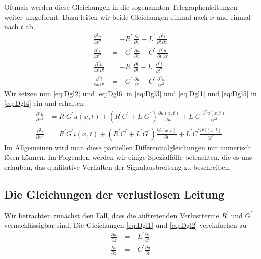 \documentclass[paper=a4, parskip=half-, ngerman, fontsize=11pt]{scrreprt}
\begin{document}
Oftmals werden diese Gleichungen in die sogenannten Telegraphenleitungen weiter umgeformt. Dazu leiten wir beide
Gleichungen einmal nach $x$ und einmal nach $t$ ab,
\begin{align}
    \frac{\partial^{2} u}{\partial x^2} &= -R^{\prime} \, \frac{\partial i}{\partial x} - L^{\prime} \,
    \frac{\partial^2 i}{\partial t \,
    \partial x} \label{eq:Dgl3} \\[1.5ex]
    \frac{\partial^{2} i}{\partial x^2} &= -G^{\prime} \, \frac{\partial u}{\partial x} - C^{\prime} \,
    \frac{\partial^2 u}{\partial t \,
    \partial x} \label{eq:Dgl4} \\[1.5ex]
    \frac{\partial^{2} u}{\partial x \, \partial t} &= -R^{\prime} \, \frac{\partial i}{\partial t} - L^{\prime} \,
    \frac{\partial^2
    i}{\partial t^{2}} \label{eq:Dgl5} \\[1.5ex]
    \frac{\partial^{2} i}{\partial x \, \partial t} &= -G^{\prime} \, \frac{\partial u}{\partial t} - C^{\prime} \,
    \frac{\partial^2
    u}{\partial t^{2}} \label{eq:Dgl6}
\end{align}
Wir setzen nun \eqref{eq:Dgl2} und \eqref{eq:Dgl6} in \eqref{eq:Dgl3} und \eqref{eq:Dgl1} und \eqref{eq:Dgl5} in
\eqref{eq:Dgl4} ein und erhalten
\begin{align}
    \frac{\partial^{2} u}{\partial x^{2}} &= R^{\prime} G^{\prime} u(x,t) + (R^{\prime} C^{\prime} + L^{\prime}
    G^{\prime}) \frac{\partial u(x, t)}{\partial t} + L^{\prime} C^{\prime} \frac{\partial^{2} u(x,t)}{\partial t^{2}}
    \\[1.5ex]
    \frac{\partial^{2} i}{\partial x^{2}} &= R^{\prime} G^{\prime} i(x,t) + (R^{\prime} C^{\prime} + L^{\prime}
    G^{\prime}) \frac{\partial i(x, t)}{\partial t} + L^{\prime} C^{\prime} \frac{\partial^{2} i(x, t)}{\partial t^{2}}
\end{align}
Im Allgemeinen wird man diese partiellen Differentialgleichungen nur numerisch lösen können. Im Folgenden werden wir
einige Spezialfälle betrachten, die es uns erlauben, das qualitative Verhalten der Signalausbreitung zu beschreiben.


\subsection{Die Gleichungen der verlustlosen Leitung}
Wir betrachten zunächst den Fall, dass die auftretenden Verlustterme $R^{\prime}$ und $G^{\prime}$ vernachlässigbar
sind, Die Gleichungen \eqref{eq:Dgl1} und \eqref{eq:Dgl2} vereinfachen zu
\begin{align}
    \frac{\partial u}{\partial z} &= - L^{\prime} \frac{\partial i}{\partial t} \label{eq:Dgl7} \\
    \frac{\partial i}{\partial z} &= - C^{\prime} \frac{\partial u}{\partial t} \label{eq:Dgl8}
\end{align}
\end{document}
